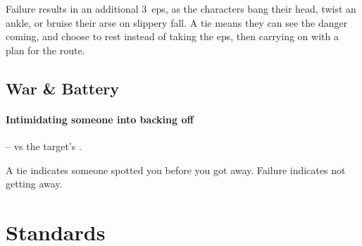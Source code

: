 \begin{multicols}{2}
Failure results in an additional 3~\glspl{ep}, as the characters bang their head, twist an ankle, or bruise their arse on slippery fall.
A tie means they can see the danger coming, and choose to rest instead of taking the \glspl{ep}, then carrying on with a plan for the route.

\subsection{War \& Battery}


\paragraph{Intimidating someone into backing off} --  vs the target's .

A tie indicates someone spotted you before you got away.
Failure indicates not getting away.

\end{multicols}

\section{Standards}

